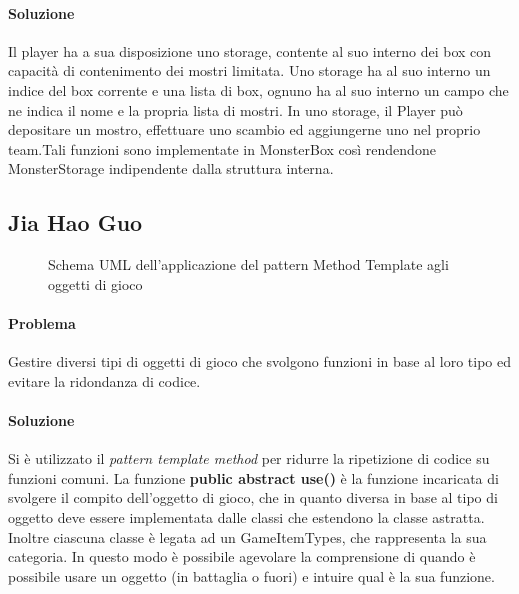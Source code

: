\paragraph{Soluzione}
Il player ha a sua disposizione uno storage, contente al suo interno dei box con capacità di contenimento dei mostri limitata.
Uno storage ha al suo interno un indice del box corrente e una lista di box, ognuno ha al suo interno un campo che ne indica il nome e la propria lista di mostri.
In uno storage, il Player può depositare un mostro, effettuare uno scambio ed aggiungerne uno nel proprio team.Tali funzioni sono implementate in MonsterBox così rendendone MonsterStorage indipendente dalla struttura interna.


\subsection*{Jia Hao Guo}
\begin{figure}[H]
\centering

\caption{Schema UML dell'applicazione del pattern Method Template agli oggetti di gioco}
\label{img:GameItem_UML}
\end{figure}

\paragraph{Problema}
Gestire diversi tipi di oggetti di gioco che svolgono funzioni in base al loro tipo ed evitare la ridondanza di codice.

\paragraph{Soluzione}
Si è utilizzato il \emph{pattern template method} per ridurre la ripetizione di codice su funzioni comuni.
La funzione \textbf{public abstract use()} è la funzione incaricata di svolgere il compito dell'oggetto di gioco, che in quanto diversa in base al tipo di oggetto deve essere implementata dalle classi che estendono la classe astratta.
\newline
Inoltre ciascuna classe è legata ad un GameItemTypes, che rappresenta la sua categoria. In questo modo è possibile agevolare la comprensione di quando è possibile usare un oggetto (in battaglia o fuori) e intuire qual è la sua funzione.



